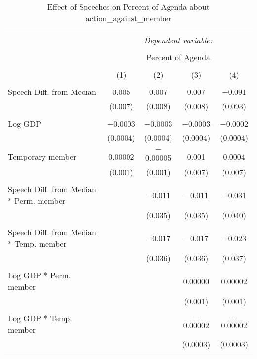 
\begin{table}[!htbp] \centering 
  \caption{Effect of Speeches on Percent of Agenda about  action_against_member} 
  \label{} 
\begin{tabular}{@{\extracolsep{5pt}}lcccc} 
\\[-1.8ex]\hline 
\hline \\[-1.8ex] 
 & \multicolumn{4}{c}{\textit{Dependent variable:}} \\ 
\cline{2-5} 
\\[-1.8ex] & \multicolumn{4}{c}{Percent of Agenda} \\ 
\\[-1.8ex] & (1) & (2) & (3) & (4)\\ 
\hline \\[-1.8ex] 
 Speech Diff. from Median & 0.005 & 0.007 & 0.007 & $-$0.091 \\ 
  & (0.007) & (0.008) & (0.008) & (0.093) \\ 
  & & & & \\ 
 Log GDP & $-$0.0003 & $-$0.0003 & $-$0.0003 & $-$0.0002 \\ 
  & (0.0004) & (0.0004) & (0.0004) & (0.0004) \\ 
  & & & & \\ 
 Temporary member & 0.00002 & $-$0.00005 & 0.001 & 0.0004 \\ 
  & (0.001) & (0.001) & (0.007) & (0.007) \\ 
  & & & & \\ 
 Speech Diff. from Median * Perm. member &  & $-$0.011 & $-$0.011 & $-$0.031 \\ 
  &  & (0.035) & (0.035) & (0.040) \\ 
  & & & & \\ 
 Speech Diff. from Median * Temp. member &  & $-$0.017 & $-$0.017 & $-$0.023 \\ 
  &  & (0.036) & (0.036) & (0.037) \\ 
  & & & & \\ 
 Log GDP * Perm. member &  &  & 0.00000 & 0.00002 \\ 
  &  &  & (0.001) & (0.001) \\ 
  & & & & \\ 
 Log GDP * Temp. member &  &  & $-$0.00002 & $-$0.00002 \\ 
  &  &  & (0.0003) & (0.0003) \\ 
  & & & & \\ 

\end{tabular}
\end{table}
